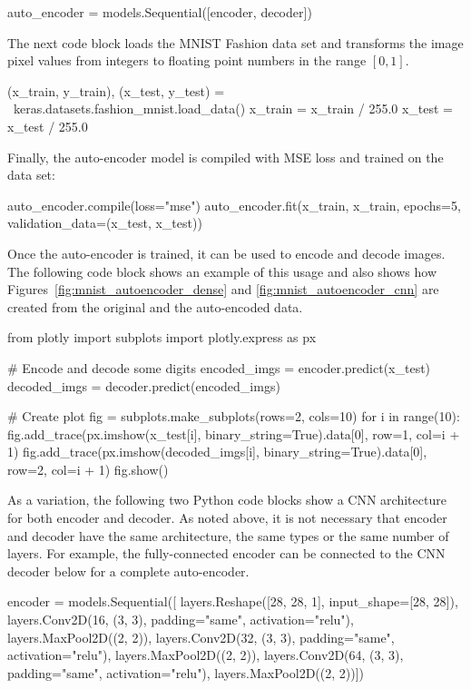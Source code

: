 \begin{withcode}
\begin{pythoncode}
auto_encoder = models.Sequential([encoder, decoder])
\end{pythoncode}

The next code block loads the MNIST Fashion data set and transforms the image pixel values from integers to floating point numbers in the range $[0,1]$.

\begin{pythoncode}
(x_train, y_train), (x_test, y_test) = \
                    keras.datasets.fashion_mnist.load_data()
x_train = x_train / 255.0
x_test = x_test / 255.0
\end{pythoncode}

Finally, the auto-encoder model is compiled with MSE loss and trained on the data set:

\begin{pythoncode}
auto_encoder.compile(loss="mse")
auto_encoder.fit(x_train, x_train, 
                 epochs=5, validation_data=(x_test, x_test))
\end{pythoncode}

Once the auto-encoder is trained, it can be used to encode and decode images. The following code block shows an example of this usage and also shows how Figures~\ref{fig:mnist_autoencoder_dense} and \ref{fig:mnist_autoencoder_cnn} are created from the original and the auto-encoded data.

\begin{pythoncode}
from plotly import subplots
import plotly.express as px

# Encode and decode some digits
encoded_imgs = encoder.predict(x_test)
decoded_imgs = decoder.predict(encoded_imgs)

# Create plot
fig = subplots.make_subplots(rows=2, cols=10)
for i in range(10):
    fig.add_trace(px.imshow(x_test[i], 
        binary_string=True).data[0], row=1, col=i + 1)
    fig.add_trace(px.imshow(decoded_imgs[i], 
        binary_string=True).data[0], row=2, col=i + 1)
fig.show()
\end{pythoncode}

As a variation, the following two Python code blocks show a CNN architecture for both encoder and decoder. As noted above, it is not necessary that encoder and decoder have the same architecture, the same types or the same number of layers. For example, the fully-connected encoder can be connected to the CNN decoder below for a complete auto-encoder.

\begin{pythoncode}
encoder = models.Sequential([
    layers.Reshape([28, 28, 1], input_shape=[28, 28]),
    layers.Conv2D(16, (3, 3), padding="same", activation="relu"),
    layers.MaxPool2D((2, 2)),
    layers.Conv2D(32, (3, 3), padding="same", activation="relu"),
    layers.MaxPool2D((2, 2)),
    layers.Conv2D(64, (3, 3), padding="same", activation="relu"),
    layers.MaxPool2D((2, 2))])
\end{pythoncode}


\end{withcode}
